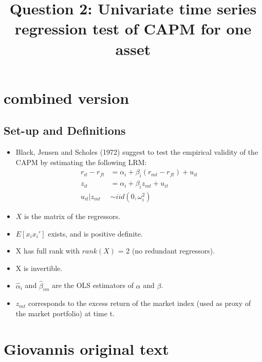 \documentclass[]{article}
\title{Question 2: Univariate time series regression test of CAPM for one asset}
\author{}
\begin{document}
\maketitle
\section{combined version}
\subsection{Set-up and Definitions}
\begin{itemize}
	\item Black, Jensen and Scholes (1972) suggest to test the empirical validity of the CAPM by estimating the following LRM: 
	\begin{align*}
		r_{it} - r_{ft} &= \alpha_i + \beta_i(r_{mt} - r_{ft}) + u_{it}\\
		z_{it} &= \alpha_i + \beta_i z_{mt} + u_{it}\\
		u_{it}|z_{mt} &\sim iid(0, \omega^2_i)
	\end{align*}
	\item $X$ is the matrix of the regressors.	
	\item $E[x_ix_i']$ exists, and is positive definite.	
	\item X has full rank with ${rank}(X)$ = 2 (no redundant regressors).
	\item X is invertible.	
	\item $\hat{\alpha}_i$ and $\hat{\beta}_{im}$ are the OLS estimators of $\alpha$ and $\beta$.
	\item $z_{mt}$ corresponds to the excess return of the market index (used as proxy of the market portfolio) at time t. 
\end{itemize}

\section{Giovannis original text}
\end{document}
